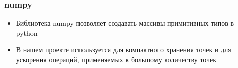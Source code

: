 \begin{frame}\frametitle{numpy}
    \begin{itemize}
    \item Библиотека numpy позволяет создавать массивы примитивных типов в python
        \item В нашем проекте используется для компактного хранения точек и для ускорения операций, применяемых к большому количеству точек
    \end{itemize}
\end{frame}
